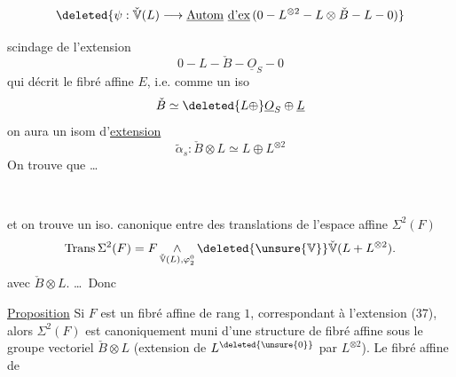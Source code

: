 \[
\deleted{\psi:\check{\mathbb V}(L)\longrightarrow\underline{\operatorname{Autom}}\ \underline{\text{d'ex}}\,
(0\mathbin{-}L^{\otimes2}\mathbin{-}L\otimes\check B\mathbin{-}L\mathbin{-}0)}
\]

scindage de  l'extension
\[
0\mathbin{-}L\mathbin{-}\check B\mathbin{-}\underline O_S\mathbin{-}0 \tag*{(37)}
\]
qui décrit le fibré affine $E$, i.e. comme
un iso
\[
\check B\simeq\deleted{L\oplus}\underline O_S\oplus\underline{L}
\]
on aura un isom d'\uline{extension}
\[
\widetilde\alpha_s:\check B\otimes L\simeq L\oplus L^{\otimes2} \tag*{(38)}
\]
On trouve que \ldots

\noindent\textemdash\ \textemdash\ \textemdash

et on  trouve un iso. canonique
entre  des translations de l'espace
affine $\Sigma^2(F)$ 
\[
\operatorname{Trans}\Sigma^2(F)=F\mathop{\wedge}_{\check{\mathbb V}(L),\varphi_2^0}
\deleted{\unsure{\mathbb V}}\check{\mathbb V}(L+L^{\otimes2}).
\]
avec $\check B\otimes L$. \ldots\ Donc

\uline{Proposition}  Si $F$ est un fibré affine
de rang $1$,  correspondant à l'extension
\unsure{(3\ldots{}|(30\ldots{}} (37), alors $\Sigma^2(F)$ est canoniquement
muni d'une structure de fibré affine
sous le groupe vectoriel $\check B\otimes L$ (extension de
$L^{\deleted{\unsure{0}}}$ par $L^{\otimes2}$). Le fibré  affine de


